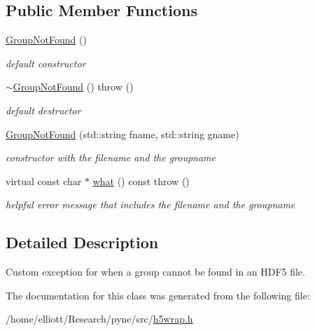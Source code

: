 \subsection*{Public Member Functions}
\begin{DoxyCompactItemize}
\item 
\hypertarget{classh5wrap_1_1_group_not_found_accc7d7bea9e86968335a46ee39d7d543}{\hyperlink{classh5wrap_1_1_group_not_found_accc7d7bea9e86968335a46ee39d7d543}{Group\-Not\-Found} ()}\label{classh5wrap_1_1_group_not_found_accc7d7bea9e86968335a46ee39d7d543}

\begin{DoxyCompactList}\small\item\em default constructor \end{DoxyCompactList}\item 
\hypertarget{classh5wrap_1_1_group_not_found_a79dea7d1d5e3ffd7a7e83b4a2636398a}{\hyperlink{classh5wrap_1_1_group_not_found_a79dea7d1d5e3ffd7a7e83b4a2636398a}{$\sim$\-Group\-Not\-Found} ()  throw ()}\label{classh5wrap_1_1_group_not_found_a79dea7d1d5e3ffd7a7e83b4a2636398a}

\begin{DoxyCompactList}\small\item\em default destructor \end{DoxyCompactList}\item 
\hypertarget{classh5wrap_1_1_group_not_found_a74f7e8f6efcf33503f5fec62eead40c3}{\hyperlink{classh5wrap_1_1_group_not_found_a74f7e8f6efcf33503f5fec62eead40c3}{Group\-Not\-Found} (std\-::string fname, std\-::string gname)}\label{classh5wrap_1_1_group_not_found_a74f7e8f6efcf33503f5fec62eead40c3}

\begin{DoxyCompactList}\small\item\em constructor with the filename and the groupname \end{DoxyCompactList}\item 
\hypertarget{classh5wrap_1_1_group_not_found_a76766dc5fda0a07564379db454df87d0}{virtual const char $\ast$ \hyperlink{classh5wrap_1_1_group_not_found_a76766dc5fda0a07564379db454df87d0}{what} () const   throw ()}\label{classh5wrap_1_1_group_not_found_a76766dc5fda0a07564379db454df87d0}

\begin{DoxyCompactList}\small\item\em helpful error message that includes the filename and the groupname \end{DoxyCompactList}\end{DoxyCompactItemize}


\subsection{Detailed Description}
Custom exception for when a group cannot be found in an H\-D\-F5 file. 

The documentation for this class was generated from the following file\-:\begin{DoxyCompactItemize}
\item 
/home/elliott/\-Research/pyne/src/\hyperlink{h5wrap_8h}{h5wrap.\-h}\end{DoxyCompactItemize}
